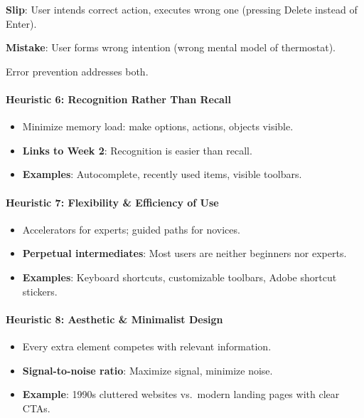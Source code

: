 \begin{tipbox}
\textbf{Slip}: User intends correct action, executes wrong one (pressing Delete instead of Enter).

\textbf{Mistake}: User forms wrong intention (wrong mental model of thermostat).

Error prevention addresses both.
\end{tipbox}

\paragraph*{Heuristic 6: Recognition Rather Than Recall}
\begin{itemize}
  \item Minimize memory load: make options, actions, objects visible.
  \item \textbf{Links to Week 2}: Recognition is easier than recall.
  \item \textbf{Examples}: Autocomplete, recently used items, visible toolbars.
\end{itemize}

\paragraph*{Heuristic 7: Flexibility \& Efficiency of Use}
\begin{itemize}
  \item Accelerators for experts; guided paths for novices.
  \item \textbf{Perpetual intermediates}: Most users are neither beginners nor experts.
  \item \textbf{Examples}: Keyboard shortcuts, customizable toolbars, Adobe shortcut stickers.
\end{itemize}

\paragraph*{Heuristic 8: Aesthetic \& Minimalist Design}
\begin{itemize}
  \item Every extra element competes with relevant information.
  \item \textbf{Signal-to-noise ratio}: Maximize signal, minimize noise.
  \item \textbf{Example}: 1990s cluttered websites vs.\ modern landing pages with clear CTAs.
\end{itemize}

